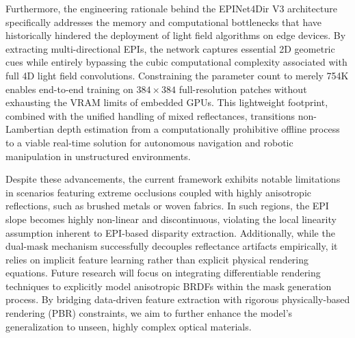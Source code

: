\documentclass[lettersize,journal]{IEEEtran}
\begin{document}
Furthermore, the engineering rationale behind the EPINet4Dir V3 architecture specifically addresses the memory and computational bottlenecks that have historically hindered the deployment of light field algorithms on edge devices. By extracting multi-directional EPIs, the network captures essential 2D geometric cues while entirely bypassing the cubic computational complexity associated with full 4D light field convolutions. Constraining the parameter count to merely 754K enables end-to-end training on $384 \times 384$ full-resolution patches without exhausting the VRAM limits of embedded GPUs. This lightweight footprint, combined with the unified handling of mixed reflectances, transitions non-Lambertian depth estimation from a computationally prohibitive offline process to a viable real-time solution for autonomous navigation and robotic manipulation in unstructured environments.

Despite these advancements, the current framework exhibits notable limitations in scenarios featuring extreme occlusions coupled with highly anisotropic reflections, such as brushed metals or woven fabrics. In such regions, the EPI slope becomes highly non-linear and discontinuous, violating the local linearity assumption inherent to EPI-based disparity extraction. Additionally, while the dual-mask mechanism successfully decouples reflectance artifacts empirically, it relies on implicit feature learning rather than explicit physical rendering equations. Future research will focus on integrating differentiable rendering techniques to explicitly model anisotropic BRDFs within the mask generation process. By bridging data-driven feature extraction with rigorous physically-based rendering (PBR) constraints, we aim to further enhance the model's generalization to unseen, highly complex optical materials.
\end{document}
